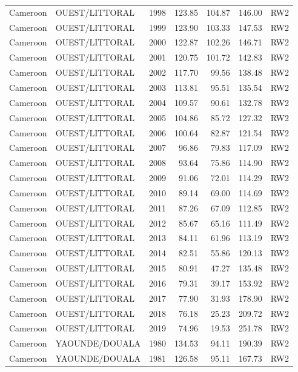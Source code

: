 \begin{longtable}{lllrrrl}
  Cameroon & OUEST/LITTORAL & 1998 & 123.85 & 104.87 & 146.00 & RW2 \\ 
  Cameroon & OUEST/LITTORAL & 1999 & 123.90 & 103.33 & 147.53 & RW2 \\ 
  Cameroon & OUEST/LITTORAL & 2000 & 122.87 & 102.26 & 146.71 & RW2 \\ 
  Cameroon & OUEST/LITTORAL & 2001 & 120.75 & 101.72 & 142.83 & RW2 \\ 
  Cameroon & OUEST/LITTORAL & 2002 & 117.70 & 99.56 & 138.48 & RW2 \\ 
  Cameroon & OUEST/LITTORAL & 2003 & 113.81 & 95.51 & 135.54 & RW2 \\ 
  Cameroon & OUEST/LITTORAL & 2004 & 109.57 & 90.61 & 132.78 & RW2 \\ 
  Cameroon & OUEST/LITTORAL & 2005 & 104.86 & 85.72 & 127.32 & RW2 \\ 
  Cameroon & OUEST/LITTORAL & 2006 & 100.64 & 82.87 & 121.54 & RW2 \\ 
  Cameroon & OUEST/LITTORAL & 2007 & 96.86 & 79.83 & 117.09 & RW2 \\ 
  Cameroon & OUEST/LITTORAL & 2008 & 93.64 & 75.86 & 114.90 & RW2 \\ 
  Cameroon & OUEST/LITTORAL & 2009 & 91.06 & 72.01 & 114.29 & RW2 \\ 
  Cameroon & OUEST/LITTORAL & 2010 & 89.14 & 69.00 & 114.69 & RW2 \\ 
  Cameroon & OUEST/LITTORAL & 2011 & 87.26 & 67.09 & 112.85 & RW2 \\ 
  Cameroon & OUEST/LITTORAL & 2012 & 85.67 & 65.16 & 111.49 & RW2 \\ 
  Cameroon & OUEST/LITTORAL & 2013 & 84.11 & 61.96 & 113.19 & RW2 \\ 
  Cameroon & OUEST/LITTORAL & 2014 & 82.51 & 55.86 & 120.13 & RW2 \\ 
  Cameroon & OUEST/LITTORAL & 2015 & 80.91 & 47.27 & 135.48 & RW2 \\ 
  Cameroon & OUEST/LITTORAL & 2016 & 79.31 & 39.17 & 153.92 & RW2 \\ 
  Cameroon & OUEST/LITTORAL & 2017 & 77.90 & 31.93 & 178.90 & RW2 \\ 
  Cameroon & OUEST/LITTORAL & 2018 & 76.18 & 25.23 & 209.72 & RW2 \\ 
  Cameroon & OUEST/LITTORAL & 2019 & 74.96 & 19.53 & 251.78 & RW2 \\ 
  Cameroon & YAOUNDE/DOUALA & 1980 & 134.53 & 94.11 & 190.39 & RW2 \\ 
  Cameroon & YAOUNDE/DOUALA & 1981 & 126.58 & 95.11 & 167.73 & RW2 \\ 

\end{longtable}
